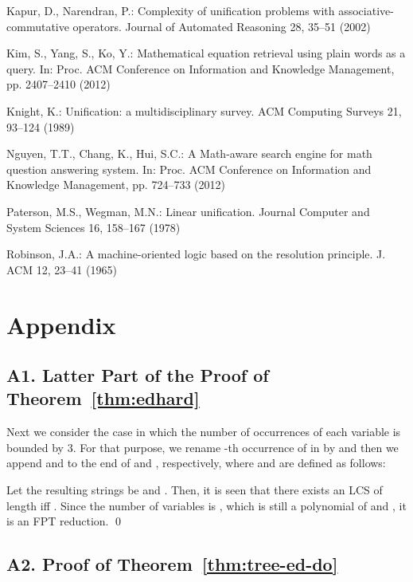 \documentclass[a4paper]{llncs}
\begin{document}
\begin{thebibliography}{99}
Kapur, D., Narendran, P.:
Complexity of unification problems with associative-commutative operators.
Journal of Automated Reasoning 28, 35--51 (2002)

Kim, S., Yang, S., Ko, Y.:
Mathematical equation retrieval using plain words as a query.
In: Proc. ACM Conference on Information and Knowledge Management,
pp. 2407--2410 (2012)

Knight, K.:
Unification: a multidisciplinary survey.
ACM Computing Surveys 21, 93--124 (1989)


Nguyen, T.T., Chang, K., Hui, S.C.:
A Math-aware search engine for math question answering system.
In: Proc. ACM Conference on Information and Knowledge Management,
pp. 724--733 (2012)

Paterson, M.S., Wegman, M.N.:
Linear unification.
Journal Computer and System Sciences 16, 158--167 (1978)

Robinson, J.A.:
A machine-oriented logic based on the resolution principle.
J. ACM 12, 23--41 (1965)

\end{thebibliography}



\newpage

\section*{Appendix}

\subsection*{A1. Latter Part of the Proof of Theorem~\ref{thm:edhard}}

Next we consider the case in which the number of occurrences of each
variable is bounded by 3.
For that purpose, we rename -th occurrence of  in 
by  and then we append  and
 to the end of  and , respectively,
where  and  are defined as follows:

Let the resulting strings be  and .
Then, it is seen that
there exists an LCS of length  iff
.
Since the number of variables is , which is still a polynomial of
 and , it is an FPT reduction.
\qed

\subsection*{A2. Proof of Theorem~\ref{thm:tree-ed-do}}
\end{document}
